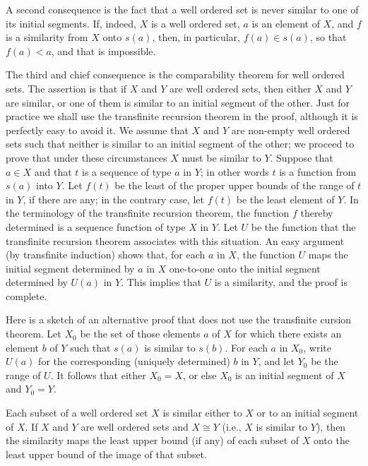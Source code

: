 A second consequence is the fact that a well ordered set is never similar to one of its initial segments. If, indeed, $X$ is a well ordered set, $a$ is an element of $X$, and $f$ is a similarity from $X$ onto $s(a)$, then, in particular, $f(a) \in s(a)$, so that $f(a) < a$, and that is impossible. 

The third and chief consequence is the comparability theorem for well ordered sets. The assertion is that if $X$ and $Y$ are well ordered sets, then either $X$ and $Y$ are similar, or one of them is similar to an initial segment of the other. Just for practice we shall use the transfinite recursion theorem in the proof, although it is perfectly easy to avoid it. We assume that $X$ and $Y$ are non-empty well ordered sets such that neither is similar to an initial segment of the other; we proceed to prove that under these circumstances $X$ must be similar to $Y$. Suppose that $a \in X$ and that $t$ is a sequence of type $a$ in $Y$; in other words $t$ is a function from $s(a)$ into $Y$. Let $f(t)$ be the least of the proper upper bounds of the range of $t$ in $Y$, if there are any; in the contrary case, let $f(t)$ be the least element of $Y$. In the terminology of the transfinite recursion theorem, the function $f$ thereby determined is a sequence function of type $X$ in $Y$. Let $U$ be the function that the transfinite recursion theorem associates with this situation. An easy argument (by transfinite induction) shows that, for each $a$ in $X$, the function $U$ maps the initial segment determined by $a$ in $X$ one-to-one onto the initial segment determined by $U(a)$ in $Y$. This implies that $U$ is a similarity, and the proof is complete. 

Here is a sketch of an alternative proof that does not use the transfinite cursion theorem. Let $X_{0}$ be the set of those elements $a$ of $X$ for which there exists an element $b$ of $Y$ such that $s(a)$ is similar to $s(b)$. For each $a$ in $X_{0}$, write $U(a)$ for the corresponding (uniquely determined) $b$ in $Y$, and let $Y_{0}$ be the range of $U$. It follows that either $X_{0} = X$, or else $X_{0}$ is an initial segment of $X$ and $Y_{0} = Y$. 

\begin{exercise} Each subset of a well ordered set $X$ is similar either to $X$ or to an initial segment of $X$. If $X$ and $Y$ are well ordered sets and $X \cong Y$ (i.e., $X$ is similar to $Y$), then the similarity maps the least upper bound (if any) of each subset of $X$ onto the least upper bound of the image of that subset.
\end{exercise}
